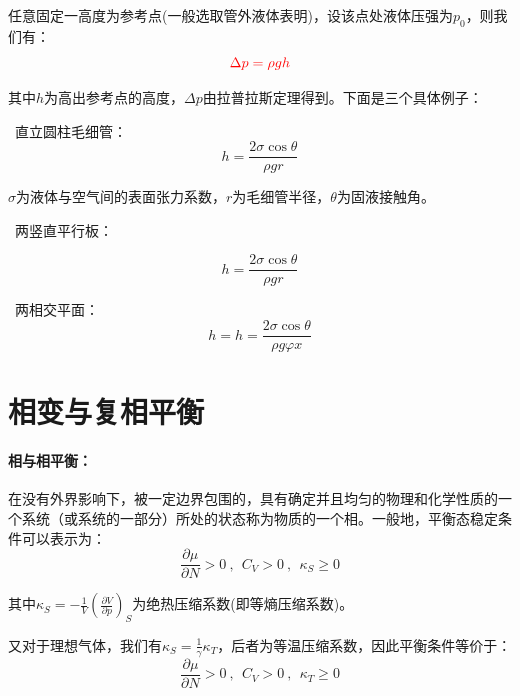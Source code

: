\documentclass[zihao=5,UTF8]{report}
\begin{document}
任意固定一高度为参考点(一般选取管外液体表明)，设该点处液体压强为$p_0$，则我们有：
\begin{equation}
    {\color{red}\Delta p = \rho g h}
\end{equation}
{\par\color{gray}\small
其中$h$为高出参考点的高度，$\Delta p$由拉普拉斯定理得到。下面是三个具体例子：
\par}

{\par\color{gray}\small
\par{}\  直立圆柱毛细管：
\begin{equation*}
    h = \frac{2\sigma \cos\theta}{\rho gr}
\end{equation*}  
{\par\color{gray}\small
$\sigma$为液体与空气间的表面张力系数，$r$为毛细管半径，$\theta$为固液接触角。
\par}\par
{}\   两竖直平行板：  \par
{\par\color{gray}\small
\begin{equation*}
    h = \frac{2\sigma \cos\theta}{\rho gr}
\end{equation*}
\par}
\  两相交平面：
\begin{equation*}
    h= h = \frac{2\sigma \cos\theta}{\rho g \varphi x}
\end{equation*}   \par
\par}


\chapter{相变与复相平衡}
\subsubsection{相与相平衡：}
在没有外界影响下，被一定边界包围的，具有确定并且均匀的物理和化学性质的一个系统（或系统的一部分）所处的状态称为物质的一个相。一般地，平衡态稳定条件可以表示为：
\begin{equation}
    \frac{\partial \mu }{\partial N } >0\ ,\ \ C_V >0\ ,\ \ \kappa_S \ge 0
\end{equation}
{\par\color{gray}\small
其中$\kappa_S = - \frac{1}{V}\left(\frac{\partial V}{\partial p }\right)_{S}$为绝热压缩系数(即等熵压缩系数)。
\par}
又对于理想气体，我们有$\kappa_S = \frac{1}{\gamma}\kappa_T$，后者为等温压缩系数，因此平衡条件等价于：
\begin{equation}
    \frac{\partial \mu }{\partial N } >0\ ,\ \ C_V >0\ ,\ \ \kappa_T \ge 0
\end{equation}
\end{document}
